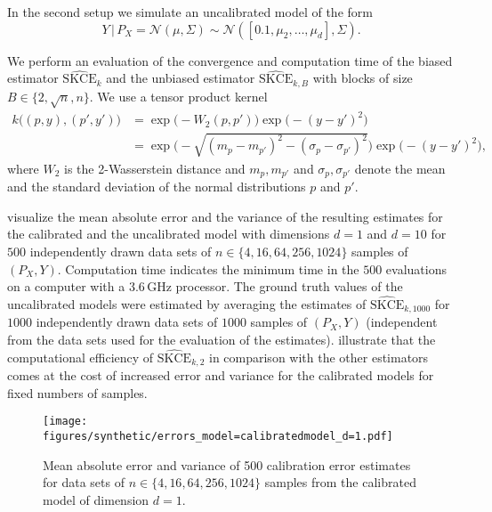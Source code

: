 \documentclass{article}
\begin{document}
In the second setup we simulate an uncalibrated model of the form
\begin{equation*}
    Y \,|\, P_X = \mathcal{N}(\mu, \Sigma) \sim \mathcal{N}([0.1, \mu_2, \ldots, \mu_d], \Sigma).
\end{equation*}

We perform an evaluation of the convergence and computation time of the biased estimator
$\widehat{\mathrm{SKCE}}_k$ and the unbiased estimator $\widehat{\mathrm{SKCE}}_{k,B}$ with
blocks of size $B \in \{2, \sqrt{n}, n\}$. We use a tensor product kernel
\begin{equation*}
\begin{split}
    k\big((p, y), (p', y')\big) &= \exp{\big(- W_2(p, p')\big)} \exp{\big(-(y - y')^2\big)} \\
    &= \exp{\bigg(-\sqrt{(m_p - m_{p'})^2 - (\sigma_p - \sigma_{p'})^2}\bigg)} \exp{\big( - (y - y')^2\big)},
\end{split}
\end{equation*}
where $W_2$ is the 2-Wasserstein distance and $m_p, m_{p'}$ and $\sigma_p, \sigma_{p'}$
denote the mean and the standard deviation of the normal distributions $p$ and $p'$.

 visualize the mean absolute error and the variance
of the resulting estimates for the calibrated and the uncalibrated model with dimensions
$d = 1$ and $d = 10$ for $500$ independently drawn data sets of $n \in \{4, 16, 64, 256, 1024\}$
samples of $(P_X, Y)$. Computation time indicates the minimum time in the $500$ evaluations
on a computer with a 3.6\,GHz processor. The ground truth values of the uncalibrated models were
estimated by averaging the estimates of $\widehat{\mathrm{SKCE}}_{k,1000}$
for $1000$ independently drawn data sets of $1000$ samples of $(P_X, Y)$ (independent from
the data sets used for the evaluation of the estimates).  illustrate that
the computational efficiency of $\widehat{\mathrm{SKCE}}_{k,2}$ in comparison with the
other estimators comes at the cost of increased error and variance for the calibrated models
for fixed numbers of samples.

\begin{figure}[hpt]
    \begin{center}
        \texttt{[image: figures/synthetic/errors\_model=calibratedmodel\_d=1.pdf]}
        \caption{Mean absolute error and variance of 500 calibration error estimates for
        data sets of $n \in \{4, 16, 64, 256, 1024\}$ samples from the calibrated model
        of dimension $d = 1$.}
        \label{fig:synthetic_error_calibrated_1}
    \end{center}
\end{figure}
\end{document}
